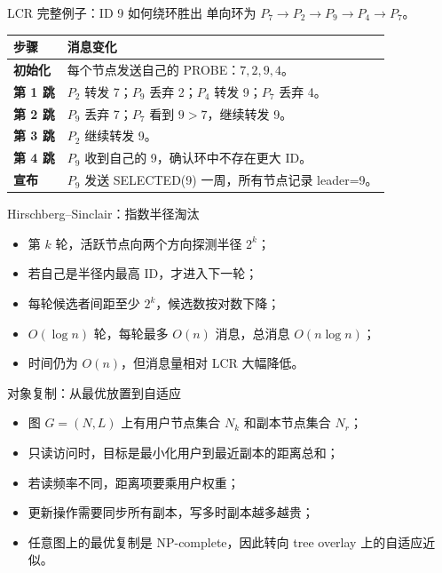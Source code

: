 \documentclass[UTF8,fontset=none,aspectratio=169,10pt]{beamer}
\begin{document}
{\begin{frame}{LCR 完整例子：ID 9 如何绕环胜出}
\small
单向环为 $P_7\rightarrow P_2\rightarrow P_9\rightarrow P_4\rightarrow P_7$。
\begin{center}
\begin{tabularx}{.96\linewidth}{>{\bfseries}p{1.6cm}X}
\toprule
步骤 & 消息变化 \\
\midrule
初始化 & 每个节点发送自己的 PROBE：$7,2,9,4$。 \\
第 1 跳 & $P_2$ 转发 7；$P_9$ 丢弃 2；$P_4$ 转发 9；$P_7$ 丢弃 4。 \\
第 2 跳 & $P_9$ 丢弃 7；$P_7$ 看到 $9>7$，继续转发 9。 \\
第 3 跳 & $P_2$ 继续转发 9。 \\
第 4 跳 & $P_9$ 收到自己的 9，确认环中不存在更大 ID。 \\
宣布 & $P_9$ 发送 SELECTED(9) 一周，所有节点记录 leader=9。 \\
\bottomrule
\end{tabularx}
\end{center}
\end{frame}

\begin{frame}{Hirschberg--Sinclair：指数半径淘汰}
\begin{itemize}
  \item 第 $k$ 轮，活跃节点向两个方向探测半径 $2^k$；
  \item 若自己是半径内最高 ID，才进入下一轮；
  \item 每轮候选者间距至少 $2^k$，候选数按对数下降；
  \item $O(\log n)$ 轮，每轮最多 $O(n)$ 消息，总消息 $O(n\log n)$；
  \item 时间仍为 $O(n)$，但消息量相对 LCR 大幅降低。
\end{itemize}
\end{frame}

\begin{frame}{对象复制：从最优放置到自适应}
\begin{itemize}
  \item 图 $G=(N,L)$ 上有用户节点集合 $N_k$ 和副本节点集合 $N_r$；
  \item 只读访问时，目标是最小化用户到最近副本的距离总和；
  \item 若读频率不同，距离项要乘用户权重；
  \item 更新操作需要同步所有副本，写多时副本越多越贵；
  \item 任意图上的最优复制是 NP-complete，因此转向 tree overlay 上的自适应近似。
\end{itemize}
\end{frame}

}
\end{document}
